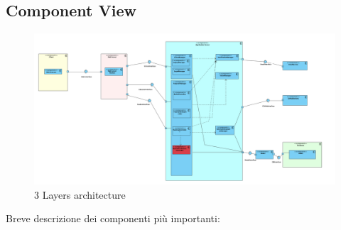 \subsection{Component View}
\begin{figure}[H]
    \centering
    \includegraphics[width=1.1\textwidth]{Design/ComponentDiagram.png}
    \caption{3 Layers architecture}
    \label{fig:enter-label}
\end{figure}
Breve descrizione dei componenti più importanti:
